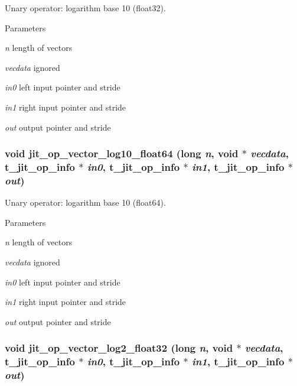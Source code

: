 Unary operator: logarithm base 10 (float32). 
\begin{DoxyParams}{Parameters}
\item[{\em n}]length of vectors \item[{\em vecdata}]ignored \item[{\em in0}]left input pointer and stride \item[{\em in1}]right input pointer and stride \item[{\em out}]output pointer and stride \end{DoxyParams}
\hypertarget{group__opvecmod_gad819f34d227cfc92b4ed72972f4036ea}{
\subsubsection[{jit\_\-op\_\-vector\_\-log10\_\-float64}]{\setlength{\rightskip}{0pt plus 5cm}void jit\_\-op\_\-vector\_\-log10\_\-float64 (long {\em n}, \/  void $\ast$ {\em vecdata}, \/  {\bf t\_\-jit\_\-op\_\-info} $\ast$ {\em in0}, \/  {\bf t\_\-jit\_\-op\_\-info} $\ast$ {\em in1}, \/  {\bf t\_\-jit\_\-op\_\-info} $\ast$ {\em out})}}
\label{group__opvecmod_gad819f34d227cfc92b4ed72972f4036ea}


Unary operator: logarithm base 10 (float64). 
\begin{DoxyParams}{Parameters}
\item[{\em n}]length of vectors \item[{\em vecdata}]ignored \item[{\em in0}]left input pointer and stride \item[{\em in1}]right input pointer and stride \item[{\em out}]output pointer and stride \end{DoxyParams}
\hypertarget{group__opvecmod_ga962dedc87c39d85e6bd21d765a865a67}{
\subsubsection[{jit\_\-op\_\-vector\_\-log2\_\-float32}]{\setlength{\rightskip}{0pt plus 5cm}void jit\_\-op\_\-vector\_\-log2\_\-float32 (long {\em n}, \/  void $\ast$ {\em vecdata}, \/  {\bf t\_\-jit\_\-op\_\-info} $\ast$ {\em in0}, \/  {\bf t\_\-jit\_\-op\_\-info} $\ast$ {\em in1}, \/  {\bf t\_\-jit\_\-op\_\-info} $\ast$ {\em out})}}
\label{group__opvecmod_ga962dedc87c39d85e6bd21d765a865a67}


